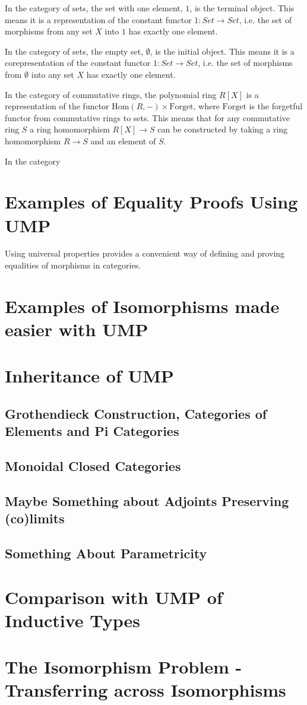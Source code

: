\documentclass[12pt]{article} %
\theoremstyle{definition}
\theoremstyle{definition}
\theoremstyle{definition}
\theoremstyle{definition}
\begin{document}
In the category of sets, the set with one element, $1$, is the terminal object. This means it is a representation
of the constant functor $1 : Set \to Set$, i.e. the set of morphisms from any set $X$ into $1$ has exactly
one element.

In the category of sets, the empty set, $\emptyset$, is the initial object. This means it is a corepresentation
of the constant functor $1 : Set \to Set$, i.e. the set of morphisms from $\emptyset$ into any set $X$ has
exactly one element.

In the category of commutative rings, the polynomial ring $R[X]$ is a representation of the functor
$\text{Hom}(R, -) \times \text{Forget}$, where $\text{Forget}$ is the forgetful
functor from commutative rings to sets. This means that for any commutative ring $S$ a ring homomorphism
$R[X] \to S$ can be constructed by taking a ring homomorphism $R \to S$ and an element of $S$.

In the category


\section{Examples of Equality Proofs Using UMP}

Using universal properties provides a convenient way of defining and proving equalities of morphisms in
categories.

\section{Examples of Isomorphisms made easier with UMP}


\section{Inheritance of UMP}

\subsection{Grothendieck Construction, Categories of Elements and Pi Categories}

\subsection{Monoidal Closed Categories}

\subsection{Maybe Something about Adjoints Preserving (co)limits}

\subsection{Something About Parametricity}

\section{Comparison with UMP of Inductive Types}

\section{The Isomorphism Problem - Transferring across Isomorphisms}
\end{document}
